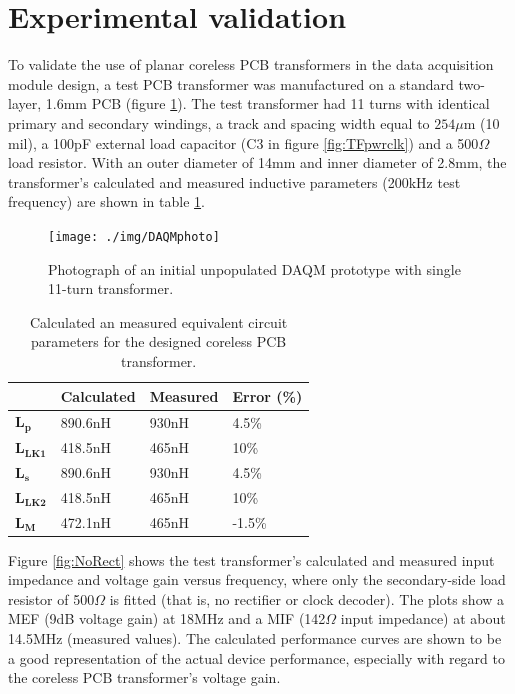 \documentclass[conference]{IEEEtran}
\begin{document}
\section{Experimental validation}
To validate the use of planar coreless PCB transformers in the data acquisition module design, a test PCB transformer was manufactured on a standard two-layer, 1.6mm PCB (figure \ref{fig:DAQMphoto}).  The test transformer had 11 turns with identical primary and secondary windings, a track and spacing width equal to $ 254\mu $m (10 mil), a 100pF external load capacitor (C3 in figure \ref{fig:TFpwrclk}) and a 500$\Omega$ load resistor.  With an outer diameter of 14mm and inner diameter of 2.8mm, the transformer's calculated and measured inductive parameters (200kHz test frequency) are shown in table \ref{tab:transformerParameters}.

\begin{figure}[t]
	\centering
	\texttt{[image: ./img/DAQMphoto]}
	\caption{Photograph of an initial unpopulated DAQM prototype with single 11-turn transformer.}
	\label{fig:DAQMphoto}
\end{figure}

\begin{table}[t]
	\centering
	\caption{Calculated an measured equivalent circuit parameters for the designed coreless PCB transformer.}
	\label{tab:transformerParameters}
	\begin{tabular}{l|l|l|l|}
	\cline{2-4}
	              & \textbf{Calculated} & \textbf{Measured} & \textbf{Error (\%)} \\[3pt] \hline 
	\multicolumn{1}{|l|}{$\mathbf{L_{p}}$}   & 890.6nH    & 930nH    & 4.5\%      \\[3pt] \hline 
	\multicolumn{1}{|l|}{$\mathbf{L_{LK1}}$} & 418.5nH    & 465nH    & 10\%       \\[3pt] \hline 
	\multicolumn{1}{|l|}{$\mathbf{L_{s}}$}   & 890.6nH    & 930nH    & 4.5\%      \\[3pt] \hline 
	\multicolumn{1}{|l|}{$\mathbf{L_{LK2}}$} & 418.5nH    & 465nH    & 10\%       \\[3pt] \hline 
	\multicolumn{1}{|l|}{$\mathbf{L_{M}}$}   & 472.1nH    & 465nH    & -1.5\%     \\[3pt] \hline
	\end{tabular}
\end{table}

Figure \ref{fig:NoRect} shows the test transformer's calculated and measured input impedance and voltage gain versus frequency, where only the secondary-side load resistor of 500$\Omega$ is fitted (that is, no rectifier or clock decoder).  The plots show a MEF (9dB voltage gain) at 18MHz and a MIF (142$\Omega$ input impedance) at about 14.5MHz (measured values).  The calculated performance curves are shown to be a good representation of the actual device performance, especially with regard to the coreless PCB transformer's voltage gain.
\end{document}
